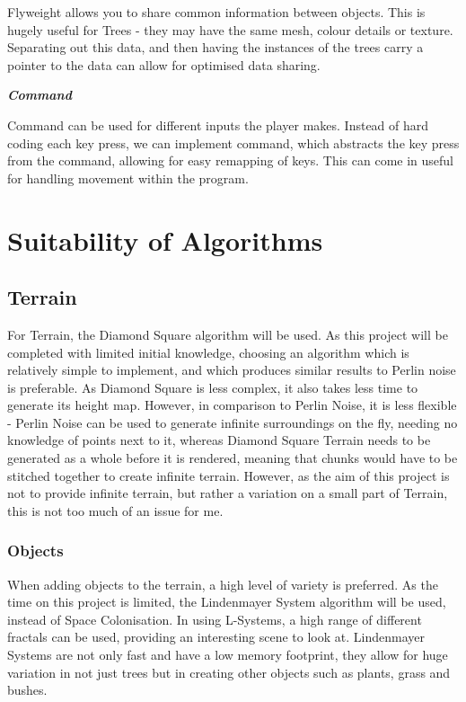 \documentclass[a4paper,10pt]{report}
\begin{document}
Flyweight allows you to share common information between objects. This is hugely useful for Trees - they may have the same mesh, colour details or texture. Separating out this data, and then having the instances of the trees carry a pointer to the data can allow for optimised data sharing. \medskip

\emph{\textbf{Command}}\medskip

Command can be used for different inputs the player makes. Instead of hard coding each key press, we can implement command, which abstracts the key press from the command, allowing for easy remapping of keys. This can come in useful for handling movement within the program. 

\section{Suitability of Algorithms}

\subsection{Terrain}

For Terrain, the Diamond Square algorithm will be used. As this project will be completed with limited initial knowledge, choosing an algorithm which is relatively simple to implement, and which produces similar results to Perlin noise is preferable. As Diamond Square is less complex, it also takes less time to generate its height map. However, in comparison to Perlin Noise, it is less flexible - Perlin Noise can be used to generate infinite surroundings on the fly, needing no knowledge of points next to it, whereas Diamond Square Terrain needs to be generated as a whole before it is rendered, meaning that chunks would have to be stitched together to create infinite terrain. However, as the aim of this project is not to provide infinite terrain, but rather a variation on a small part of Terrain, this is not too much of an issue for me. 

\subsubsection{Objects}

When adding objects to the terrain, a high level of variety is preferred. As the time on this project is limited, the Lindenmayer System algorithm will be used, instead of Space Colonisation. In using L-Systems, a high range of different fractals can be used, providing an interesting scene to look at. Lindenmayer Systems are not only fast and have a low memory footprint, they allow for huge variation in not just trees but in creating other objects such as plants, grass and bushes. 
\end{document}
